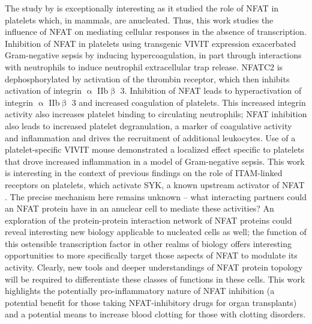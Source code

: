The study by \citet{Poli2022} is exceptionally interesting as it studied the role of NFAT in platelets which, in mammals, are anucleated. Thus, this work studies the influence of NFAT on mediating cellular responses in the absence of transcription. Inhibition of NFAT in platelets using transgenic VIVIT expression exacerbated Gram\hyp{}negative sepsis by inducing hypercoagulation, in part through interactions with neutrophils to induce neutrophil extracellular trap release. NFATC2 is dephosphorylated by activation of the thrombin receptor, which then inhibits activation of integrin $\upalpha$ IIb$\upbeta$ 3. Inhibition of NFAT leads to hyperactivation of integrin $\upalpha$ IIb$\upbeta$ 3 and increased coagulation of platelets. This increased integrin activity also increases platelet binding to circulating neutrophils; NFAT inhibition also leads to increased platelet degranulation, a marker of coagulative activity and inflammation and drives the recruitment of additional leukocytes. Use of a platelet\hyp{}specific VIVIT mouse demonstrated a localized effect specific to platelets that drove increased inflammation in a model of Gram\hyp{}negative sepsis. This work is interesting in the context of previous findings on the role of ITAM\hyp{}linked receptors on platelets, which activate SYK, a known upstream activator of NFAT \citep{Manne2015}. The precise mechanism here remains unknown -- what interacting partners could an NFAT protein have in an anuclear cell to mediate these activities? An exploration of the protein\hyp{}protein interaction network of NFAT proteins could reveal interesting new biology applicable to nucleated cells as well; the function of this ostensible transcription factor in other realms of biology offers interesting opportunities to more specifically target those aspects of NFAT to modulate its activity. Clearly, new tools and deeper understandings of NFAT protein topology will be required to differentiate these classes of functions in these cells. This work highlights the potentially pro\hyp{}inflammatory nature of NFAT inhibition (a potential benefit for those taking NFAT\hyp{}inhibitory drugs for organ transplants) and a potential means to increase blood clotting for those with clotting disorders.

